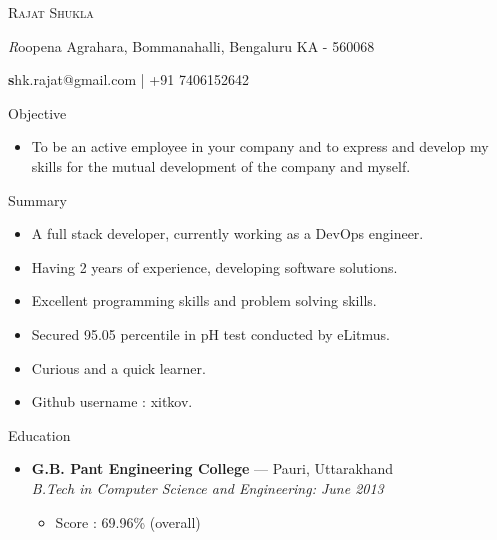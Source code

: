 \documentclass[11pt,oneside]{article}
\makeatletter
\newcommand{\name}{Rajat Shukla}
\newcommand{\addr}{Roopena Agrahara, Bommanahalli, Bengaluru KA - 560068}
\newcommand{\contact}{shk.rajat@gmail.com | +91 7406152642}
\newcommand{\bigname}[1]{
  \begin{center}\fontfamily{phv}\selectfont\Huge\scshape#1\end{center}
}
\newcommand{\bignamenew}[1]{
  \begin{center}\selectfont\Huge\scshape#1\end{center}
}
\newcommand{\addrinfo}[1]{
  \begin{center}\selectfont\small\textit#1\end{center}
}
\newcommand{\contactinfo}[1]{
  \begin{center}\selectfont\small\textbf#1\end{center}
}
\newcommand{\resdescpara}[1]{
  \vspace{-5pt}
\item
  #1
}
\newenvironment{ressection}[1]{
  \vspace{4pt}
	     {\fontfamily{phv}\selectfont\Large#1}
	     \begin{itemize}
	       \vspace{3pt}
}{
	     \end{itemize}
}
\newcommand{\resitem}[1]{
  \vspace{-4pt}
\item \begin{flushleft} #1 \end{flushleft}
}
\newcommand{\ressubitem}[1]{
  \vspace{-1pt}
\item \begin{flushleft} #1 \end{flushleft}
}
\newcommand{\resbigitem}[3]{
  \vspace{-5pt}
\item
  \textbf{#1} --- #2 \\
  \textit{#3}
}
\newenvironment{ressubsec}[3]{
  \resbigitem{#1}{#2}{#3}
  \vspace{-2pt}
  \begin{itemize}
}{
  \end{itemize}
}
\makeatother
\begin{document}



\bigname{\name}

\vspace{2 pt}
\addrinfo{\addr}

\contactinfo{\contact}
\vspace{8 pt}


\begin{ressection}{Objective}
  \resdescpara{To be an active employee in your company and to express and develop my skills for the mutual development of the company and myself.}
\end{ressection}


\begin{ressection}{Summary}
  \resitem{A full stack developer, currently working as a DevOps engineer.}
  \resitem{Having 2 years of experience, developing software solutions.}
  \resitem{Excellent programming skills and problem solving skills.}
  \resitem{Secured 95.05 percentile in pH test conducted by eLitmus.}
  \resitem{Curious and a quick learner.}  
  \resitem{Github username : xitkov.}
\end{ressection}



\begin{ressection}{Education}
  \begin{ressubsec}{G.B. Pant Engineering College}{Pauri, Uttarakhand}{B.Tech in Computer Science and Engineering: June 2013}
	\ressubitem{Score : 69.96\% (overall)}
  \end{ressubsec}
\end{ressection}

\end{document}
